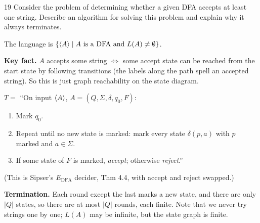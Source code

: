 \begin{question}{19}
Consider the problem of determining whether a given DFA accepts at least one string. Describe an algorithm for solving this problem and explain why it always terminates.
\end{question}
\begin{soln}
The language is $\{\langle A\rangle\mid A \text{ is a DFA and } L(A)\neq\emptyset\}$.

\textbf{Key fact.} $A$ accepts some string $\iff$ some accept state can be reached from the start state by following transitions (the labels along the path spell an accepted string). So this is just graph reachability on the state diagram.

$T=$ ``On input $\langle A\rangle$, $A=(Q,\Sigma,\delta,q_0,F)$:
\begin{enumerate}
\item Mark $q_0$.
\item Repeat until no new state is marked: mark every state $\delta(p,a)$ with $p$ marked and $a\in\Sigma$.
\item If some state of $F$ is marked, \emph{accept}; otherwise \emph{reject}.''
\end{enumerate}
(This is Sipser's $E_{\mathrm{DFA}}$ decider, Thm 4.4, with accept and reject swapped.)

\textbf{Termination.} Each round except the last marks a new state, and there are only $|Q|$ states, so there are at most $|Q|$ rounds, each finite. Note that we never try strings one by one; $L(A)$ may be infinite, but the state graph is finite.
\end{soln}

